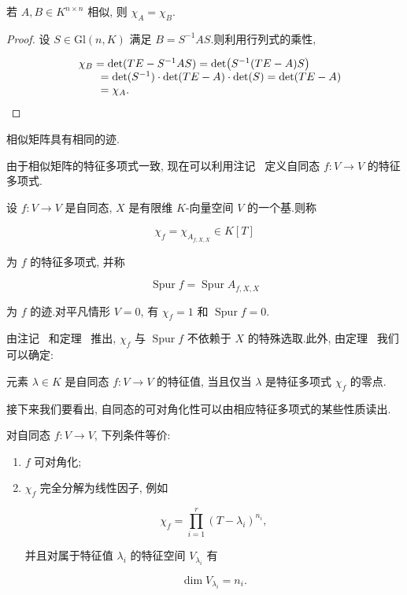 \begin{theorem}\label{thm:6.2.4}
若 $A, B \in K^{n \times n}$ 相似, 则 $\chi_A = \chi_B$.
\end{theorem}

\begin{proof}
设 $S \in \mathrm{Gl}(n, K)$ 满足 $B = S^{-1} A S$.则利用行列式的乘性,

\[
\begin{array}{r l}
& \chi_B = \det(TE - S^{-1} A S) = \det\bigl(S^{-1}(TE - A)S\bigr) \\
& \qquad = \det(S^{-1}) \cdot \det(TE - A) \cdot \det(S) = \det(TE - A) \\
& \qquad = \chi_A\text{.}
\end{array}\]

\end{proof}

\begin{corollary}[相似矩阵具有相同的迹]\label{cor:6.2.5}
相似矩阵具有相同的迹.
\end{corollary}

由于相似矩阵的特征多项式一致, 现在可以利用注记~ 定义自同态 $f \colon V \longrightarrow V$ 的特征多项式.

\begin{definition}[自同态的特征多项式与迹]\label{def:6.2.6}
设 $f \colon V \longrightarrow V$ 是自同态, $X$ 是有限维 $K$-向量空间 $V$ 的一个基.则称

\[
\chi_f = \chi_{A_{f, X, X}} \in K[T]\]

为 $f$ 的特征多项式, 并称

\[
\operatorname{Spur} f = \operatorname{Spur} A_{f, X, X}\]

为 $f$ 的迹.对平凡情形 $V = 0$, 有 $\chi_f = 1$ 和 $\operatorname{Spur} f = 0$.
\end{definition}

由注记~ 和定理~ 推出, $\chi_f$ 与 $\operatorname{Spur} f$ 不依赖于 $X$ 的特殊选取.此外, 由定理~ 我们可以确定:

\begin{theorem}\label{thm:6.2.7}
元素 $\lambda \in K$ 是自同态 $f \colon V \longrightarrow V$ 的特征值, 当且仅当 $\lambda$ 是特征多项式 $\chi_f$ 的零点.
\end{theorem}

接下来我们要看出, 自同态的可对角化性可以由相应特征多项式的某些性质读出.

\begin{theorem}\label{thm:6.2.8}
对自同态 $f \colon V \longrightarrow V$, 下列条件等价:
\begin{enumerate}
\item[(i)] $f$ 可对角化;
\item[(ii)] $\chi_f$ 完全分解为线性因子, 例如

\[
\chi_f = \prod_{i = 1}^{r} (T - \lambda_i)^{n_i},\]

并且对属于特征值 $\lambda_i$ 的特征空间 $V_{\lambda_i}$ 有

\[
\dim V_{\lambda_i} = n_i\text{.}\]
\end{enumerate}
\end{theorem}

